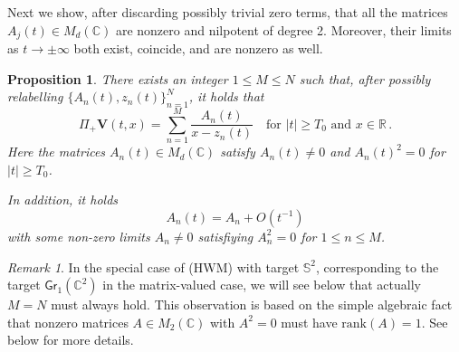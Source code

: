 \documentclass[11pt,reqno]{amsart}
\newtheorem{prop}{Proposition}[section]
\theoremstyle{definition}
\theoremstyle{remark}
\theoremstyle{remark}
\newtheorem*{remark*}{Remark}
\numberwithin{equation}{section}
\newcommand{\C}{\mathbb{C}}
\newcommand{\R}{\mathbb{R}}
\newcommand{\Ss}{\mathbb{S}}
\newcommand{\rank}{\mathrm{rank}}
\newcommand{\Vb}{\mathbf{V}}
\newcommand{\Gr}{\mathsf{Gr}}
\begin{document}
Next we show, after discarding possibly trivial zero terms, that all the matrices $A_j(t) \in M_d(\C)$ are nonzero and nilpotent of degree 2. Moreover, their limits as $t \to \pm \infty$ both exist, coincide, and are nonzero as well.

\begin{prop} \label{prop:scat}
There exists an integer $1 \leq M \leq N$ such that, after possibly relabelling $ \{ A_n(t), z_n(t) \}_{n=1}^N$, it holds that
$$
\Pi_+ \Vb(t,x) = \sum_{n=1}^M \frac{A_n(t)}{x-z_n(t)} \quad \mbox{for $|t| \geq T_0$ and $x \in \R$} \, .
$$
Here the matrices $A_n(t) \in M_d(\C)$ satisfy $A_n(t) \neq 0$ and $A_n(t)^2 = 0$ for $|t| \geq T_0$. 

In addition, it holds
$$
 A_n(t) = A_n + O(t^{-1})   
$$
with some non-zero limits $A_n \neq 0$ satisfiying $A_n^2 = 0$ for $1 \leq n \leq M$.
\end{prop}

\begin{remark*}
In the special case of (HWM) with target $\Ss^2$, corresponding to the target $\Gr_1(\C^2)$ in the matrix-valued case, we will see below that actually $M=N$ must always hold. This observation is based on the simple algebraic fact that nonzero matrices $A \in M_2(\C)$ with $A^2=0$ must have $\rank(A) = 1$. See below for more details.
\end{remark*}
\end{document}
